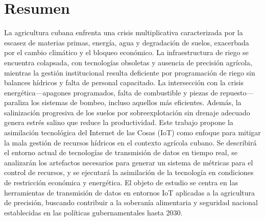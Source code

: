 \section*{Resumen}
La agricultura cubana enfrenta una crisis multiplicativa caracterizada por la escasez de materias primas, energía, agua y degradación de suelos, exacerbada por el cambio climático y el bloqueo económico. La infraestructura de riego se encuentra colapsada, con tecnologías obsoletas y ausencia de precisión agrícola, mientras la gestión institucional resulta deficiente por programación de riego sin balances hídricos y falta de personal capacitado. La intersección con la crisis energética—apagones programados, falta de combustible y piezas de repuesto—paraliza los sistemas de bombeo, incluso aquellos más eficientes. Además, la salinización progresiva de los suelos por sobreexplotación sin drenaje adecuado genera estrés salino que reduce la productividad.
Este trabajo propone la asimilación tecnológica del Internet de las Cosas (IoT) como enfoque para mitigar la mala gestión de recursos hídricos en el contexto agrícola cubano. Se describirá el entorno actual de tecnologías de transmisión de datos en tiempo real, se analizarán los artefactos necesarios para generar un sistema de métricas para el control de recursos, y se ejecutará la asimilación de la tecnología en condiciones de restricción económica y energética. El objeto de estudio se centra en las herramientas de transmisión de datos en entornos IoT aplicadas a la agricultura de precisión, buscando contribuir a la soberanía alimentaria y seguridad nacional establecidas en las políticas gubernamentales hasta 2030.




